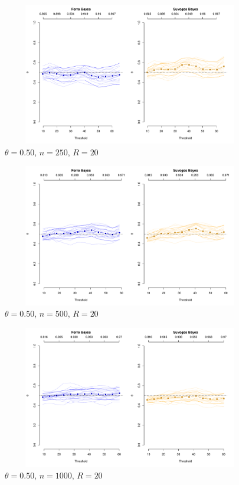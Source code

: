\documentclass[12pt]{article}
\begin{document}
\newpage

\begin{figure}
\begin{center}
\includegraphics[width=5.5in, height=2.45in]{../extremal_comparison/figs/sim_frechet_hier_50_250_20.pdf}
\caption{$\theta=0.50$, $n=250$, $R=20$}
\end{center}
\end{figure}

\begin{figure}
\begin{center}
\includegraphics[width=5.5in, height=2.45in]{../extremal_comparison/figs/sim_frechet_hier_50_500_20.pdf}
\caption{$\theta=0.50$, $n=500$, $R=20$}
\end{center}
\end{figure}

\begin{figure}
\begin{center}
\includegraphics[width=5.5in, height=2.45in]{../extremal_comparison/figs/sim_frechet_hier_50_1000_20.pdf}
\caption{$\theta=0.50$, $n=1000$, $R=20$}
\end{center}
\end{figure}
\end{document}

